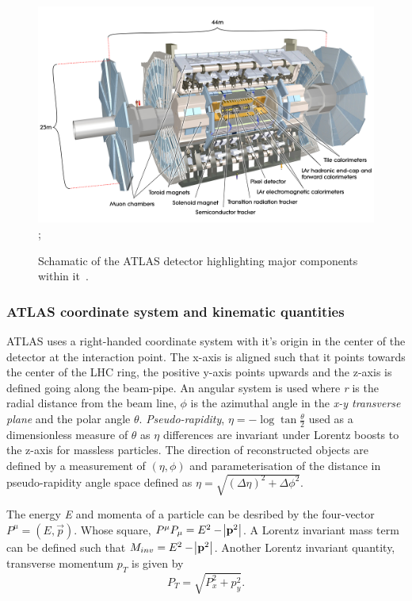 \begin{figure}
    \centering
    \includegraphics[width=\textwidth]{images/ATLAS.png};
    \caption[Schamatic of the ATLAS detector]{Schamatic of the ATLAS detector highlighting major 
            components within it~\cite{ATLASImage}.}
    \label{fig:method:ATLAS}
\end{figure}

\subsubsection{ATLAS coordinate system and kinematic quantities}

ATLAS uses a right-handed coordinate system with it's origin in the center of the detector at the 
interaction point. The x-axis is aligned such that it points towards the center of the LHC ring, the positive y-axis points upwards and the z-axis is defined going along the beam-pipe. An angular system is used where \emph{r} is the radial distance from the beam line, \emph{$\phi$} is the azimuthal angle in the \emph{x-y transverse plane} and the polar angle \emph{$\theta$}. \emph{Pseudo-rapidity}, $\eta = -\log\tan\frac{\theta}{2}$ used as a dimensionless measure of \emph{$\theta$} as \emph{$\eta$} differences are invariant under Lorentz boosts to the z-axis for massless particles. The direction of reconstructed objects are defined by a measurement of $(\eta,\phi)$ and parameterisation of the distance in pseudo-rapidity angle space defined as $\eta = \sqrt{(\Delta\eta)^{2} + {\Delta\phi}^{2}}$.

The energy \emph{E} and momenta \emph{} of a particle can be desribed by the four-vector $P^{\mu} = (E,\vec{p})$. Whose square, $P^{\mu}P_{\mu} = E^{2} - \abs{\boldsymbol{\mathbf{p}}^{2}}$. A Lorentz invariant mass term can be defined such that $M_{inv} = E^{2} - \abs{\boldsymbol{\mathbf{p}}^{2}}$. Another Lorentz invariant quantity, transverse momentum \emph{$p_{T}$} is given by
\begin{equation}
    P_{T} = \sqrt{ P_{x}^{2} + p_{y}^{2}}.
\end{equation}

